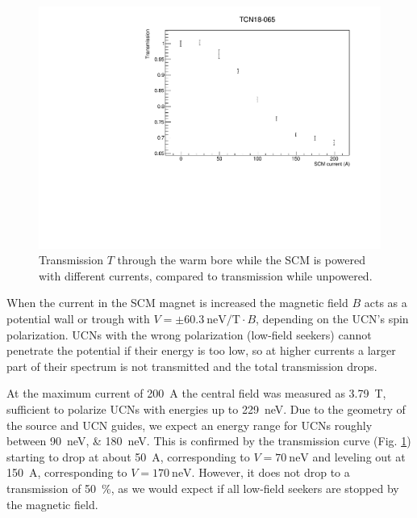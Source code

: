 \documentclass[10pt,letterpaper]{article}
\begin{document}
\begin{figure}
\centering
\includegraphics[width=\textwidth,page=1]{../transmission/TCN18-065.pdf}
\caption{Transmission $T$ through the warm bore while the SCM is powered with different currents, compared to transmission while unpowered.}
\label{fig:SCMtransmission_nofoil}
\end{figure}

When the current in the SCM magnet is increased the magnetic field $B$ acts as a potential wall or trough with $V = \pm \SI{60.3}{\nano\electronvolt\per\tesla} \cdot B$, depending on the UCN's spin polarization. UCNs with the wrong polarization (low-field seekers) cannot penetrate the potential if their energy is too low, so at higher currents a larger part of their spectrum is not transmitted and the total transmission drops.

At the maximum current of \SI{200}{\ampere} the central field was measured as \SI{3.79}{\tesla}, sufficient to polarize UCNs with energies up to \SI{229}{\nano\electronvolt}. Due to the geometry of the source and UCN guides, we expect an energy range for UCNs roughly between \SIlist{90;180}{\nano\electronvolt}. This is confirmed by the transmission curve (Fig. \ref{fig:SCMtransmission_nofoil}) starting to drop at about \SI{50}{\ampere}, corresponding to $V = \SI{70}{\nano\electronvolt}$ and leveling out at \SI{150}{\ampere}, corresponding to $V = \SI{170}{\nano\electronvolt}$. However, it does not drop to a transmission of \SI{50}{\percent}, as we would expect if all low-field seekers are stopped by the magnetic field.
\end{document}
